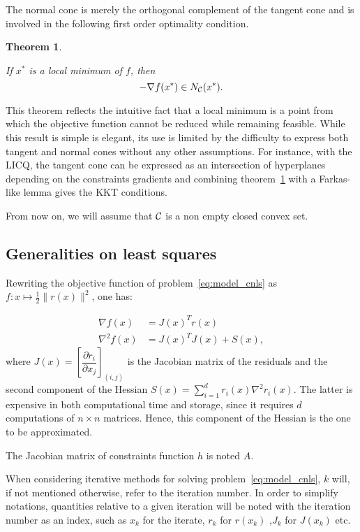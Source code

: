 \documentclass[10pt]{article}
\newtheorem{theorem}{Theorem}[]
\numberwithin{equation}{section}
\begin{document}
	The normal cone is merely the orthogonal complement of the tangent cone and is involved in the following first order optimality condition.
	
	\begin{theorem}\label{theo:first_order_normal_cone}
		
		If $x^*$ is a local minimum of $f$, then \[-\nabla f(x^*) \in N_{\mathcal{C}}(x^*).\]
	\end{theorem}
	
	This theorem reflects the intuitive fact that a local minimum is a point from which the objective function cannot be reduced while remaining feasible. While this result is simple is elegant, its use is limited by the difficulty to express both tangent and normal cones without any other assumptions. For instance, with the LICQ, the tangent cone can be expressed as an intersection of hyperplanes depending on the constraints gradients and combining theorem~\ref{theo:first_order_normal_cone} with a Farkas-like lemma gives the KKT conditions. 
	
	From now on, we will assume that ${\mathcal{C}}$ is a non empty closed convex set. 
	\subsection{Generalities on least squares}
	 
	 Rewriting the objective function of problem~\eqref{eq:model_cnls} as $f\colon x \mapsto  \frac{1}{2} \|r(x)\|^2$, one has:
	 
	 \begin{subequations}
	 		\begin{align}
	 		\nabla f(x) &= J(x)^Tr(x)\label{subeq:ls_grad} \\
	 		\nabla^2 f(x) &= J(x)^TJ(x) + S(x) , \label{subeq:ls_hessian}
	 		\end{align}
	 \end{subequations}
	 where $J(x) = \left[\dfrac{\partial r_i}{\partial x_j}\right]_{(i,j)}$ is the Jacobian matrix of the residuals and the second component of the Hessian $S(x) = \sum_{i=1}^{d} r_i(x) \nabla^2r_i(x) $. The latter is expensive in both computational time and storage, since it requires $d$ computations of $n\times n$ matrices. Hence, this component of the Hessian is the one to be approximated. 
	 
	 The Jacobian matrix of constraints function $h$ is noted $A$.
	 
	 When considering iterative methods for solving problem~\eqref{eq:model_cnls}, $k$ will, if not mentioned otherwise, refer to the iteration number. In order to simplify notations, quantities relative to a given iteration will be noted with the iteration number as an index, such as $x_k$ for the iterate, $r_k$ for $r(x_k)$ ,$J_k$ for $J(x_k)$ etc.
	 
\end{document}

